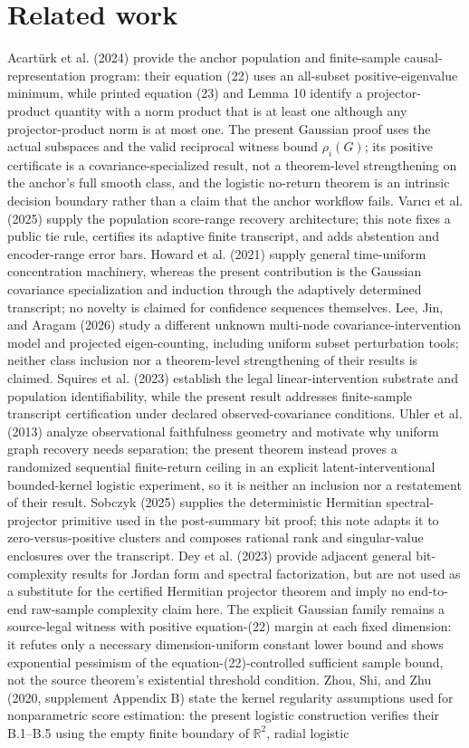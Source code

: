\documentclass{article}
\begin{document}
\section{Related work}

Acartürk et al. (2024) provide the anchor population and finite-sample causal-representation program: their equation (22) uses an all-subset positive-eigenvalue minimum, while printed equation (23) and Lemma 10 identify a projector-product quantity with a norm product that is at least one although any projector-product norm is at most one. The present Gaussian proof uses the actual subspaces and the valid reciprocal witness bound \(\rho_i(G)\); its positive certificate is a covariance-specialized result, not a theorem-level strengthening on the anchor's full smooth class, and the logistic no-return theorem is an intrinsic decision boundary rather than a claim that the anchor workflow fails. Varıcı et al. (2025) supply the population score-range recovery architecture; this note fixes a public tie rule, certifies its adaptive finite transcript, and adds abstention and encoder-range error bars. Howard et al. (2021) supply general time-uniform concentration machinery, whereas the present contribution is the Gaussian covariance specialization and induction through the adaptively determined transcript; no novelty is claimed for confidence sequences themselves. Lee, Jin, and Aragam (2026) study a different unknown multi-node covariance-intervention model and projected eigen-counting, including uniform subset perturbation tools; neither class inclusion nor a theorem-level strengthening of their results is claimed. Squires et al. (2023) establish the legal linear-intervention substrate and population identifiability, while the present result addresses finite-sample transcript certification under declared observed-covariance conditions. Uhler et al. (2013) analyze observational faithfulness geometry and motivate why uniform graph recovery needs separation; the present theorem instead proves a randomized sequential finite-return ceiling in an explicit latent-interventional bounded-kernel logistic experiment, so it is neither an inclusion nor a restatement of their result. Sobczyk (2025) supplies the deterministic Hermitian spectral-projector primitive used in the post-summary bit proof; this note adapts it to zero-versus-positive clusters and composes rational rank and singular-value enclosures over the transcript. Dey et al. (2023) provide adjacent general bit-complexity results for Jordan form and spectral factorization, but are not used as a substitute for the certified Hermitian projector theorem and imply no end-to-end raw-sample complexity claim here. The explicit Gaussian family remains a source-legal witness with positive equation-(22) margin at each fixed dimension: it refutes only a necessary dimension-uniform constant lower bound and shows exponential pessimism of the equation-(22)-controlled sufficient sample bound, not the source theorem's existential threshold condition. Zhou, Shi, and Zhu (2020, supplement Appendix B) state the kernel regularity assumptions used for nonparametric score estimation: the present logistic construction verifies their B.1--B.5 using the empty finite boundary of \(\mathbb R^2\), radial logistic 
\end{document}
